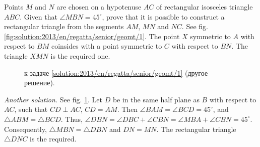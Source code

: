 \problem
Points $M$ and $N$ are chosen on a hypotenuse $AC$ of rectangular isosceles
triangle $ABC$.
Given that $\angle MBN = 45^\circ$, prove that it is possible to construct a
rectangular triangle from the segments $AM$, $MN$ and $NC$.
%
\label{solution:2013/en/regatta/senior/geomt/1}%
See fig. \ref{fig:solution:2013/en/regatta/senior/geomt/1}.
The point $X$ symmetric to $A$ with respect to $BM$ coinsides with a point
symmetric to $C$ with respect to $BN$.
The triangle $XMN$ is the required one.
\par
\begin{figure}
\centering
\caption{к задаче \ref{solution:2013/en/regatta/senior/geomt/1}
    (другое решение).}
\label{fig:solution:2013/en/regatta/senior/geomt/1/another}
\end{figure}%
\emph{Another solution.}
See fig. \ref{fig:solution:2013/en/regatta/senior/geomt/1/another}.
Let $D$ be in the same half plane as $B$ with respect to $AC$, such that
$CD \perp AC$, $CD = AM$.
Then $\angle BAM = \angle BCD = 45^\circ$, and $\triangle ABM = \triangle BCD$.
Thus,
\(
    \angle DBN = \angle DBC + \angle CBN
=
    \angle MBA + \angle CBN = 45^\circ
\).
Consequently, $\triangle MBN = \triangle DBN$ and $DN = MN$.
The rectangular triangle $\triangle DNC$ is the required.
\endproblem
